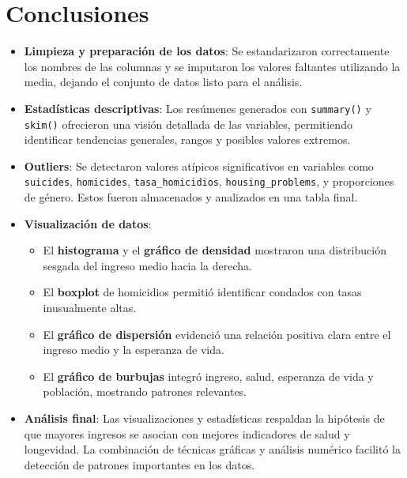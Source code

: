 \documentclass[
]{article}
\providecommand{\tightlist}{%
  \setlength{\itemsep}{0pt}\setlength{\parskip}{0pt}}
\begin{document}
\newpage

\section{Conclusiones}\label{conclusiones}

\begin{itemize}
\tightlist
\item
  \textbf{Limpieza y preparación de los datos}: Se estandarizaron
  correctamente los nombres de las columnas y se imputaron los valores
  faltantes utilizando la media, dejando el conjunto de datos listo para
  el análisis.
\item
  \textbf{Estadísticas descriptivas}: Los resúmenes generados con
  \texttt{summary()} y \texttt{skim()} ofrecieron una visión detallada
  de las variables, permitiendo identificar tendencias generales, rangos
  y posibles valores extremos.
\item
  \textbf{Outliers}: Se detectaron valores atípicos significativos en
  variables como \texttt{suicides}, \texttt{homicides},
  \texttt{tasa\_homicidios}, \texttt{housing\_problems}, y proporciones
  de género. Estos fueron almacenados y analizados en una tabla final.
\item
  \textbf{Visualización de datos}:

  \begin{itemize}
  \tightlist
  \item
    El \textbf{histograma} y el \textbf{gráfico de densidad} mostraron
    una distribución sesgada del ingreso medio hacia la derecha.
  \item
    El \textbf{boxplot} de homicidios permitió identificar condados con
    tasas inusualmente altas.
  \item
    El \textbf{gráfico de dispersión} evidenció una relación positiva
    clara entre el ingreso medio y la esperanza de vida.
  \item
    El \textbf{gráfico de burbujas} integró ingreso, salud, esperanza de
    vida y población, mostrando patrones relevantes.
  \end{itemize}
\item
  \textbf{Análisis final}: Las visualizaciones y estadísticas respaldan
  la hipótesis de que mayores ingresos se asocian con mejores
  indicadores de salud y longevidad. La combinación de técnicas gráficas
  y análisis numérico facilitó la detección de patrones importantes en
  los datos.
\end{itemize}
\end{document}
